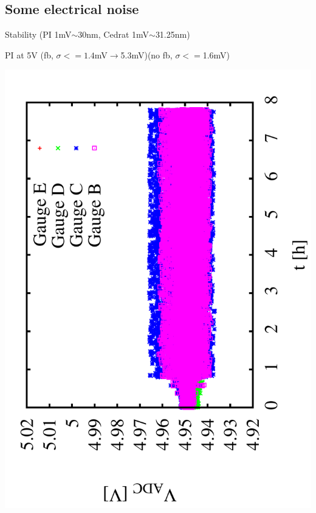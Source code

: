 \documentclass[a4paper,11pt]{book}
\begin{document}
\subsection{Some electrical noise}
Stability (PI 1mV$\sim$30nm, Cedrat 1mV$\sim$31.25nm)\par
PI at 5V \hspace{0.5cm}(fb, $\sigma<=1.4$mV$\rightarrow$5.3mV)\hspace{0.4cm}(no fb, $\sigma<=$1.6mV)\par
 \hspace*{2cm}\includegraphics[angle=-90,scale=0.15]{image_ai_21a.pdf}
\end{document}
